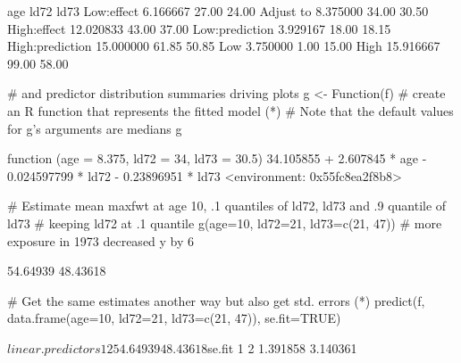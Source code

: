 \begin{Schunk}
\begin{Soutput}
                      age  ld72  ld73
Low:effect       6.166667 27.00 24.00
Adjust to        8.375000 34.00 30.50
High:effect     12.020833 43.00 37.00
Low:prediction   3.929167 18.00 18.15
High:prediction 15.000000 61.85 50.85
Low              3.750000  1.00 15.00
High            15.916667 99.00 58.00
\end{Soutput}
\begin{Sinput}
                      # and predictor distribution summaries driving plots
g <- Function(f)  # create an R function that represents the fitted model (*\ipacue*)
# Note that the default values for g's arguments are medians
g
\end{Sinput}
\begin{Soutput}
function (age = 8.375, ld72 = 34, ld73 = 30.5) 
{
    34.105855 + 2.607845 * age - 0.024597799 * ld72 - 0.23896951 * 
        ld73
}
<environment: 0x55fc8ea2f8b8>
\end{Soutput}
\begin{Sinput}
# Estimate mean maxfwt at age 10, .1 quantiles of ld72, ld73 and .9 quantile of ld73
# keeping ld72 at .1 quantile
g(age=10, ld72=21, ld73=c(21, 47))  # more exposure in 1973 decreased y by 6
\end{Sinput}
\begin{Soutput}
[1] 54.64939 48.43618
\end{Soutput}
\begin{Sinput}
# Get the same estimates another way but also get std. errors (*\ipacue*)
predict(f, data.frame(age=10, ld72=21, ld73=c(21, 47)), se.fit=TRUE)
\end{Sinput}
\begin{Soutput}
$linear.predictors
       1        2 
54.64939 48.43618 

$se.fit
       1        2 
1.391858 3.140361 
\end{Soutput}
\end{Schunk}

